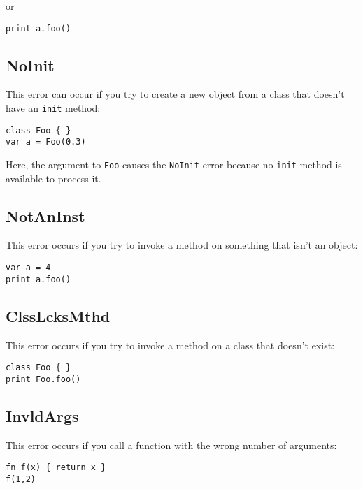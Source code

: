 or

\begin{lstlisting}
print a.foo()
\end{lstlisting}

\hypertarget{noinit}{%
\subsection{NoInit}\label{noinit}}

This error can occur if you try to create a new object from a class that
doesn't have an \texttt{init} method:

\begin{lstlisting}
class Foo { }
var a = Foo(0.3)
\end{lstlisting}

Here, the argument to \texttt{Foo} causes the \texttt{NoInit} error
because no \texttt{init} method is available to process it.

\hypertarget{notaninst}{%
\subsection{NotAnInst}\label{notaninst}}

This error occurs if you try to invoke a method on something that isn't
an object:

\begin{lstlisting}
var a = 4
print a.foo()
\end{lstlisting}

\hypertarget{clsslcksmthd}{%
\subsection{ClssLcksMthd}\label{clsslcksmthd}}

This error occurs if you try to invoke a method on a class that doesn't
exist:

\begin{lstlisting}
class Foo { }
print Foo.foo()
\end{lstlisting}

\hypertarget{invldargs}{%
\subsection{InvldArgs}\label{invldargs}}

This error occurs if you call a function with the wrong number of
arguments:

\begin{lstlisting}
fn f(x) { return x }
f(1,2)
\end{lstlisting}

